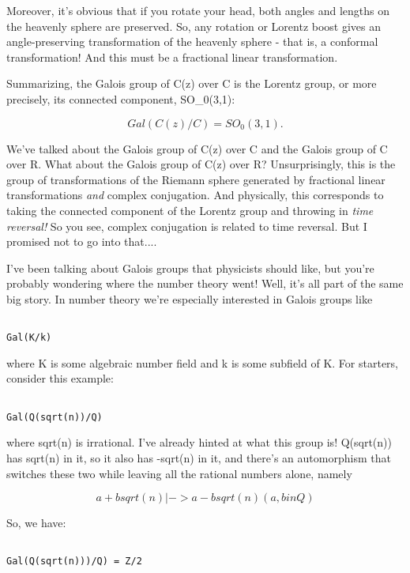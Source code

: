 Moreover, it's obvious that if you rotate your head, both angles and lengths
on the heavenly sphere are preserved.  So, any rotation or Lorentz boost 
gives an angle-preserving transformation of the heavenly sphere - that is, 
a conformal transformation!  And this must be a fractional linear 
transformation.

Summarizing, the Galois group of C(z) over C is the Lorentz group, or
more precisely, its connected component, SO_{0}(3,1):


$$

Gal(C(z)/C) = SO_{0}(3,1).
$$
    
We've talked about the Galois group of C(z) over C and the Galois group
of C over R.  What about the Galois group of C(z) over R?   Unsurprisingly,
this is the group of transformations of the Riemann sphere generated by 
fractional linear transformations \emph{and} 
complex conjugation.  And physically,
this corresponds to taking the connected component of the Lorentz group
and throwing in \emph{time reversal!}  
So you see, complex conjugation is related
to time reversal.  But I promised not to go into that....

I've been talking about Galois groups that physicists should like, but
you're probably wondering where the number theory went!  Well, it's 
all part of the same big story.  In number theory we're especially
interested in Galois groups like


\begin{verbatim}

Gal(K/k)
\end{verbatim}
    
where K is some algebraic number field and k is some subfield of K.
For starters, consider this example:


\begin{verbatim}

Gal(Q(sqrt(n))/Q)
\end{verbatim}
    
where sqrt(n) is irrational.  I've already hinted at what this group is!  
Q(sqrt(n)) has sqrt(n) in it, so it also has -sqrt(n) in it, and there's 
an automorphism that switches these two while leaving all the rational 
numbers alone, namely


$$

a + b sqrt(n) |-> a - b sqrt(n)                  (a,b in Q)
$$
    
So, we have:


\begin{verbatim}

Gal(Q(sqrt(n)))/Q) = Z/2
\end{verbatim}
    
